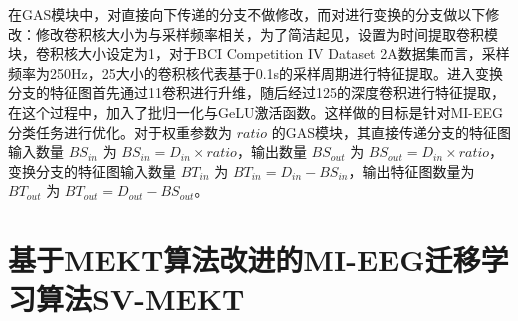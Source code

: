 在GAS模块中，对直接向下传递的分支不做修改，而对进行变换的分支做以下修改：修改卷积核大小为与采样频率相关，为了简洁起见，设置为时间提取卷积模块，卷积核大小设定为1，对于BCI Competition IV Dataset 2A数据集而言，采样频率为250Hz，25大小的卷积核代表基于0.1s的采样周期进行特征提取。进入变换分支的特征图首先通过1\times1卷积进行升维，随后经过1\times25的深度卷积进行特征提取，在这个过程中，加入了批归一化与GeLU激活函数。这样做的目标是针对MI-EEG分类任务进行优化。对于权重参数为 \(ratio\) 的GAS模块，其直接传递分支的特征图输入数量 \(BS_{in}\) 为 \(BS_{in} = D_{in} \times ratio\)，输出数量 \(BS_{out}\) 为 \(BS_{out} = D_{in} \times ratio\)，变换分支的特征图输入数量 \(BT_{in}\) 为 \(BT_{in} = D_{in} - BS_{in}\)，输出特征图数量为 \(BT_{out}\) 为 \(BT_{out} = D_{out} - BS_{out}\)。

\section{基于MEKT算法改进的MI-EEG迁移学习算法SV-MEKT}

